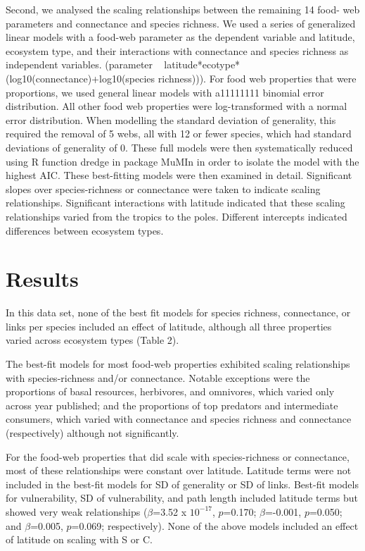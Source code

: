 \documentclass[12pt]{article}
\begin{document}
Second, we analysed the scaling relationships between the remaining 14 food-
web parameters and connectance and species richness. We used a series of
generalized linear models with a food-web parameter as the dependent variable
and latitude, ecosystem type, and their interactions with connectance and
species richness as independent variables. (parameter ~
latitude*ecotype*(log10(connectance)+log10(species richness))). For food web
properties that were proportions, we used general linear models with a11111111
binomial error distribution. All other food web properties were log-transformed with a normal error distribution.
When modelling the standard deviation of generality, this
required the removal of 5 webs, all with 12 or fewer species, which had
standard deviations of generality of 0. These full models were then
systematically reduced using R function dredge \cite{} in package MuMIn
\cite{} in order to isolate the model with the highest AIC. These best-fitting models were 
then examined in detail. Significant slopes over species-richness or connectance were taken to indicate scaling
relationships. Significant interactions with latitude indicated that these scaling relationships varied from the tropics
to the poles. Different intercepts indicated differences between ecosystem types.


\section*{Results}

In this data set, none of the best fit models for species richness, connectance, or links per species included an 
effect of latitude, although all three properties varied across ecosystem types (Table 2). 


The best-fit models for most food-web properties exhibited scaling relationships with species-richness and/or 
connectance. Notable exceptions were the proportions of basal resources, herbivores, and omnivores, which varied only 
across year published; and the proportions of top predators and intermediate consumers, which varied with connectance 
and species richness and connectance (respectively) although not significantly.


For the food-web properties that did scale with species-richness or connectance, most of these relationships were 
constant over latitude. Latitude terms were not included in the best-fit models for SD of generality or 
SD of links. Best-fit models for vulnerability, SD of vulnerability, and path length included latitude terms but showed 
very weak relationships ($\beta$=3.52 x $10^{-17}$, $p$=0.170; $\beta$=-0.001, $p$=0.050; and $\beta$=0.005, $p$=0.069; 
respectively). None of the above models included an effect of latitude on scaling with S or C.
\end{document}
